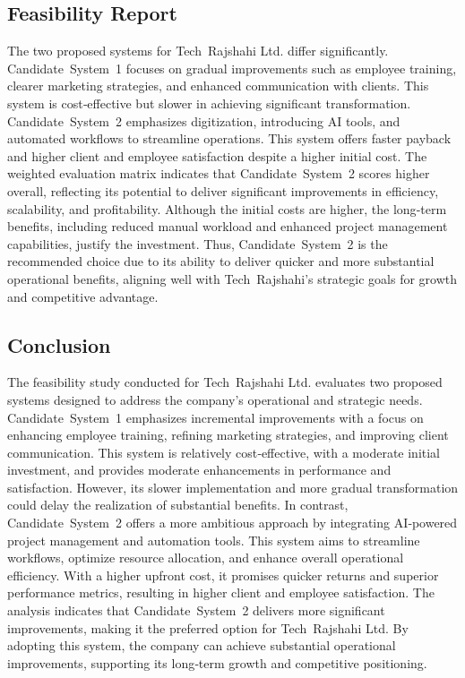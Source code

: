 \documentclass[12pt,a4paper]{article}
\begin{document}
\subsection{Feasibility Report}
The two proposed systems for Tech Rajshahi Ltd. differ significantly.  Candidate System 1 focuses on gradual improvements such as employee training, clearer marketing strategies, and enhanced communication with clients.  This system is cost‑effective but slower in achieving significant transformation.  Candidate System 2 emphasizes digitization, introducing AI tools, and automated workflows to streamline operations.  This system offers faster payback and higher client and employee satisfaction despite a higher initial cost.  The weighted evaluation matrix indicates that Candidate System 2 scores higher overall, reflecting its potential to deliver significant improvements in efficiency, scalability, and profitability.  Although the initial costs are higher, the long‑term benefits, including reduced manual workload and enhanced project management capabilities, justify the investment.  Thus, Candidate System 2 is the recommended choice due to its ability to deliver quicker and more substantial operational benefits, aligning well with Tech Rajshahi’s strategic goals for growth and competitive advantage.

\subsection{Conclusion}
The feasibility study conducted for Tech Rajshahi Ltd. evaluates two proposed systems designed to address the company’s operational and strategic needs.  Candidate System 1 emphasizes incremental improvements with a focus on enhancing employee training, refining marketing strategies, and improving client communication.  This system is relatively cost‑effective, with a moderate initial investment, and provides moderate enhancements in performance and satisfaction.  However, its slower implementation and more gradual transformation could delay the realization of substantial benefits.  In contrast, Candidate System 2 offers a more ambitious approach by integrating AI‑powered project management and automation tools.  This system aims to streamline workflows, optimize resource allocation, and enhance overall operational efficiency.  With a higher upfront cost, it promises quicker returns and superior performance metrics, resulting in higher client and employee satisfaction.  The analysis indicates that Candidate System 2 delivers more significant improvements, making it the preferred option for Tech Rajshahi Ltd.  By adopting this system, the company can achieve substantial operational improvements, supporting its long‑term growth and competitive positioning.
\end{document}
